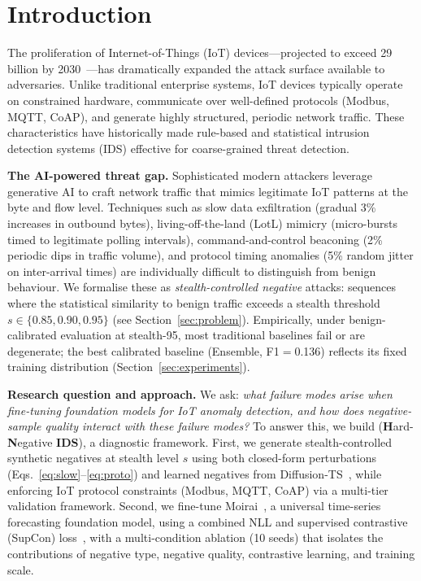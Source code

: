 \section{Introduction}
\label{sec:intro}

The proliferation of Internet-of-Things (IoT) devices---projected to exceed
29 billion by 2030~\cite{iotanalyticsmarket2023}---has dramatically expanded
the attack surface available to adversaries.  Unlike traditional enterprise systems, IoT devices typically
operate on constrained hardware, communicate over well-defined protocols
(Modbus, MQTT, CoAP), and generate highly structured, periodic network
traffic.  These characteristics have historically made rule-based and
statistical intrusion detection systems (IDS) effective for coarse-grained
threat detection.

\textbf{The AI-powered threat gap.}
Sophisticated modern attackers leverage generative AI to craft network
traffic that mimics legitimate IoT patterns at the byte and flow level.
Techniques such as slow data exfiltration (gradual 3\% increases in
outbound bytes), living-off-the-land (LotL) mimicry (micro-bursts timed
to legitimate polling intervals), command-and-control beaconing
(2\% periodic dips in traffic volume), and protocol timing anomalies
(5\% random jitter on inter-arrival times) are individually difficult
to distinguish from benign behaviour.  We formalise these as
\emph{stealth-controlled negative} attacks: sequences where the statistical similarity
to benign traffic exceeds a stealth threshold $s \in \{0.85, 0.90, 0.95\}$
(see Section~\ref{sec:problem}).
Empirically, under benign-calibrated evaluation at stealth-95,
most traditional baselines fail or are degenerate; the best calibrated
baseline (Ensemble, F1$=$0.136) reflects its fixed training distribution
(Section~\ref{sec:experiments}).

\textbf{Research question and approach.}
We ask: \emph{what failure modes arise when fine-tuning foundation models
for IoT anomaly detection, and how does negative-sample quality interact
with these failure modes?}
To answer this, we build \ours{} (\textbf{H}ard-\textbf{N}egative \textbf{IDS}),
a diagnostic framework.
First, we generate stealth-controlled synthetic negatives at
stealth level $s$ using both closed-form perturbations
(Eqs.~\ref{eq:slow}--\ref{eq:proto}) and learned negatives from
Diffusion-TS~\cite{zhang2024diffusionts}, while enforcing IoT protocol
constraints (Modbus, MQTT, CoAP) via a multi-tier validation framework.
Second, we fine-tune Moirai~\cite{woo2024moirai}, a universal time-series
forecasting foundation model, using a combined NLL and supervised contrastive
(SupCon) loss~\cite{khosla2020supcon}, with a multi-condition ablation
(10 seeds) that isolates the contributions of negative type, negative
quality, contrastive learning, and training scale.

